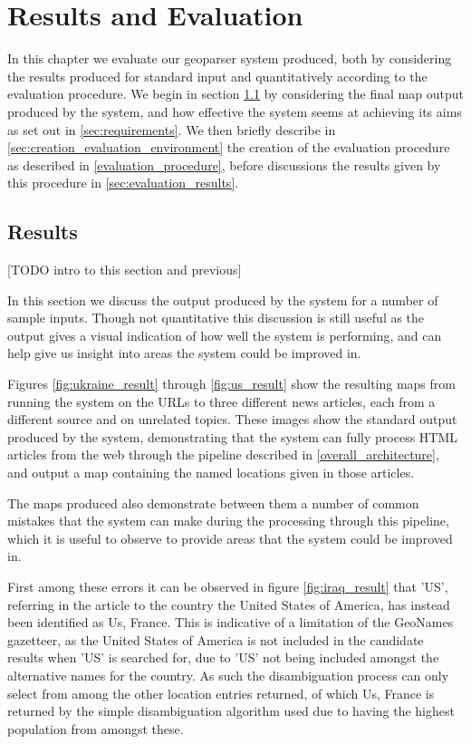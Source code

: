 \documentclass[12pt, a4paper]{report}
\begin{document}
\chapter{Results and Evaluation}

In this chapter we evaluate our geoparser system produced, both by considering the results produced for standard input and quantitatively according to the evaluation procedure. We begin in section \ref{sec:results} by considering the final map output produced by the system, and how effective the system seems at achieving its aims as set out in \ref{sec:requirements}. We then briefly describe in \ref{sec:creation_evaluation_environment} the creation of the evaluation procedure as described in \ref{evaluation_procedure}, before discussions the results given by this procedure in \ref{sec:evaluation_results}.

\section{Results}
\label{sec:results}

[TODO intro to this section and previous]

In this section we discuss the output produced by the system for a number of sample inputs. Though not quantitative this discussion is still useful as the output gives a visual indication of how well the system is performing, and can help give us insight into areas the system could be improved in.

Figures \ref{fig:ukraine_result} through \ref{fig:us_result} show the resulting maps from running the system on the URLs to three different news articles, each from a different source and on unrelated topics. These images show the standard output produced by the system, demonstrating that the system can fully process HTML articles from the web through the pipeline described in \ref{overall_architecture}, and output a map containing the named locations given in those articles.

The maps produced also demonstrate between them a number of common mistakes that the system can make during the processing through this pipeline, which it is useful to observe to provide areas that the system could be improved in.

First among these errors it can be observed in figure \ref{fig:iraq_result} that 'US', referring in the article to the country the United States of America, has instead been identified as Us, France. This is indicative of a limitation of the GeoNames gazetteer, as the United States of America is not included in the candidate results when 'US' is searched for, due to 'US' not being included amongst the alternative names for the country. As such the disambiguation process can only select from among the other location entries returned, of which Us, France is returned by the simple disambiguation algorithm used due to having the highest population from amongst these.
\end{document}
